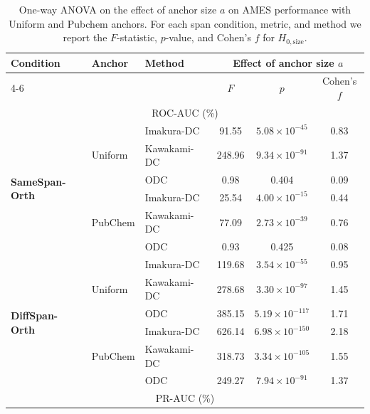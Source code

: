 \documentclass[final,3p,times]{elsarticle}
\theoremstyle{plain}
\begin{document}
\begin{table}[t]
  \centering
  \caption{One-way ANOVA on the effect of anchor size $a$ on AMES performance with Uniform and Pubchem anchors. For each span condition,
  metric, and method we report the $F$-statistic, $p$-value, and Cohen's $f$
  for $H_{0,\text{size}}$.}
  \label{tab:anova-ames}
  \begin{tabular}{lllccc}
    \toprule
    \multirow{2}{*}{Condition} & \multirow{2}{*}{Anchor} & \multirow{2}{*}{Method} & \multicolumn{3}{c}{Effect of anchor size $a$} \\
    \cmidrule(lr){4-6}
    & & & {$F$} & {$p$} & {Cohen's $f$} \\
    \midrule
    \multicolumn{6}{c}{ROC-AUC (\%)} \\
    \midrule
    \multirow{6}{*}{\textbf{SameSpan-Orth}}
      & \multirow{3}{*}{Uniform}
        & Imakura-DC~\cite{DCframework1}   & 91.55  & $5.08\times 10^{-45}$ & 0.83  \\
      &  & Kawakami-DC~\cite{KawakamiDC} & 248.96 & $9.34\times 10^{-91}$ & 1.37  \\
      &  & ODC         & 0.98   & 0.404                 & 0.09  \\
    \cmidrule(lr){2-6}
      & \multirow{3}{*}{PubChem}
        & Imakura-DC~\cite{DCframework1}   & 25.54  & $4.00\times 10^{-15}$ & 0.44  \\
      &  & Kawakami-DC~\cite{KawakamiDC} & 77.09  & $2.73\times 10^{-39}$ & 0.76  \\
      &  & ODC         & 0.93   & 0.425                 & 0.08  \\
    \midrule
    \multirow{6}{*}{\textbf{DiffSpan-Orth}}
      & \multirow{3}{*}{Uniform}
        & Imakura-DC~\cite{DCframework1}   & 119.68 & $3.54\times 10^{-55}$ & 0.95   \\
      &  & Kawakami-DC~\cite{KawakamiDC} & 278.68 & $3.30\times 10^{-97}$ & 1.45   \\
      &  & ODC         & 385.15 & $5.19\times 10^{-117}$ & 1.71  \\
    \cmidrule(lr){2-6}
      & \multirow{3}{*}{PubChem}
        & Imakura-DC~\cite{DCframework1}   & 626.14 & $6.98\times 10^{-150}$ & 2.18  \\
      &  & Kawakami-DC~\cite{KawakamiDC} & 318.73 & $3.34\times 10^{-105}$ & 1.55  \\
      &  & ODC         & 249.27 & $7.94\times 10^{-91}$  & 1.37  \\
    \midrule
    \multicolumn{6}{c}{PR-AUC (\%)} \\

\end{tabular}
\end{table}
\end{document}
